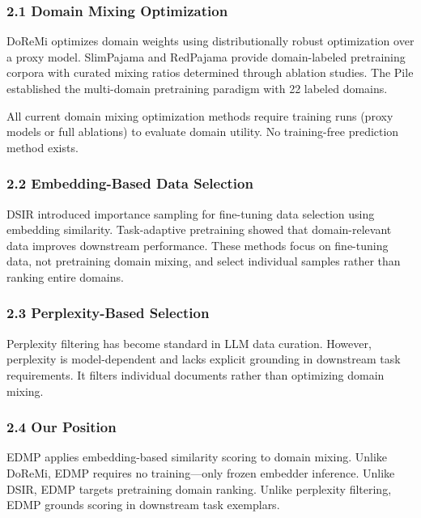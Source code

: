 
\subsubsection{2.1 Domain Mixing Optimization}

DoReMi optimizes domain weights using distributionally robust optimization over a proxy model. SlimPajama and RedPajama provide domain-labeled pretraining corpora with curated mixing ratios determined through ablation studies. The Pile established the multi-domain pretraining paradigm with 22 labeled domains.

All current domain mixing optimization methods require training runs (proxy models or full ablations) to evaluate domain utility. No training-free prediction method exists.

\subsubsection{2.2 Embedding-Based Data Selection}

DSIR introduced importance sampling for fine-tuning data selection using embedding similarity. Task-adaptive pretraining showed that domain-relevant data improves downstream performance. These methods focus on fine-tuning data, not pretraining domain mixing, and select individual samples rather than ranking entire domains.

\subsubsection{2.3 Perplexity-Based Selection}

Perplexity filtering has become standard in LLM data curation. However, perplexity is model-dependent and lacks explicit grounding in downstream task requirements. It filters individual documents rather than optimizing domain mixing.

\subsubsection{2.4 Our Position}

EDMP applies embedding-based similarity scoring to domain mixing. Unlike DoReMi, EDMP requires no training---only frozen embedder inference. Unlike DSIR, EDMP targets pretraining domain ranking. Unlike perplexity filtering, EDMP grounds scoring in downstream task exemplars.


